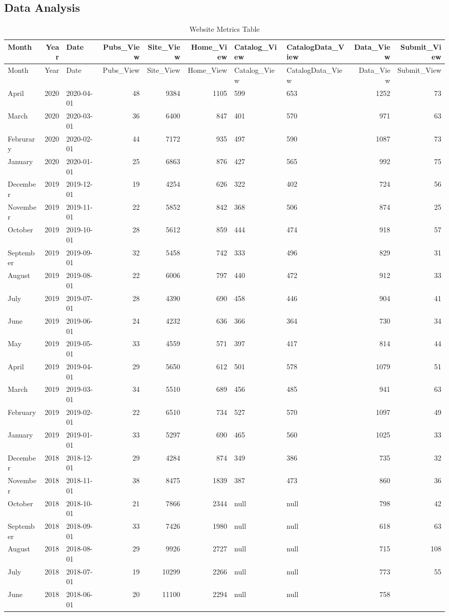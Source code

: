 \documentclass[]{article}
\begin{document}
\hypertarget{data-analysis}{%
\subsection{Data Analysis}\label{data-analysis}}

\begin{longtable}[]{@{}lrlrrrllrr@{}}
\caption{Website Metrics Table}\tabularnewline
\toprule
Month & Year & Date & Pubs\_View & Site\_View & Home\_View &
Catalog\_View & CatalogData\_View & Data\_View &
Submit\_View\tabularnewline
\midrule
\endfirsthead
\toprule
Month & Year & Date & Pubs\_View & Site\_View & Home\_View &
Catalog\_View & CatalogData\_View & Data\_View &
Submit\_View\tabularnewline
\midrule
\endhead
April & 2020 & 2020-04-01 & 48 & 9384 & 1105 & 599 & 653 & 1252 &
73\tabularnewline
March & 2020 & 2020-03-01 & 36 & 6400 & 847 & 401 & 570 & 971 &
63\tabularnewline
Februrary & 2020 & 2020-02-01 & 44 & 7172 & 935 & 497 & 590 & 1087 &
73\tabularnewline
January & 2020 & 2020-01-01 & 25 & 6863 & 876 & 427 & 565 & 992 &
75\tabularnewline
December & 2019 & 2019-12-01 & 19 & 4254 & 626 & 322 & 402 & 724 &
56\tabularnewline
November & 2019 & 2019-11-01 & 22 & 5852 & 842 & 368 & 506 & 874 &
25\tabularnewline
October & 2019 & 2019-10-01 & 28 & 5612 & 859 & 444 & 474 & 918 &
57\tabularnewline
September & 2019 & 2019-09-01 & 32 & 5458 & 742 & 333 & 496 & 829 &
31\tabularnewline
August & 2019 & 2019-08-01 & 22 & 6006 & 797 & 440 & 472 & 912 &
33\tabularnewline
July & 2019 & 2019-07-01 & 28 & 4390 & 690 & 458 & 446 & 904 &
41\tabularnewline
June & 2019 & 2019-06-01 & 24 & 4232 & 636 & 366 & 364 & 730 &
34\tabularnewline
May & 2019 & 2019-05-01 & 33 & 4559 & 571 & 397 & 417 & 814 &
44\tabularnewline
April & 2019 & 2019-04-01 & 29 & 5650 & 612 & 501 & 578 & 1079 &
51\tabularnewline
March & 2019 & 2019-03-01 & 34 & 5510 & 689 & 456 & 485 & 941 &
63\tabularnewline
February & 2019 & 2019-02-01 & 22 & 6510 & 734 & 527 & 570 & 1097 &
49\tabularnewline
January & 2019 & 2019-01-01 & 33 & 5297 & 690 & 465 & 560 & 1025 &
33\tabularnewline
December & 2018 & 2018-12-01 & 29 & 4284 & 874 & 349 & 386 & 735 &
32\tabularnewline
November & 2018 & 2018-11-01 & 38 & 8475 & 1839 & 387 & 473 & 860 &
36\tabularnewline
October & 2018 & 2018-10-01 & 21 & 7866 & 2344 & null & null & 798 &
42\tabularnewline
September & 2018 & 2018-09-01 & 33 & 7426 & 1980 & null & null & 618 &
63\tabularnewline
August & 2018 & 2018-08-01 & 29 & 9926 & 2727 & null & null & 715 &
108\tabularnewline
July & 2018 & 2018-07-01 & 19 & 10299 & 2266 & null & null & 773 &
55\tabularnewline
June & 2018 & 2018-06-01 & 20 & 11100 & 2294 & null & null & 758 &

\end{longtable}
\end{document}
